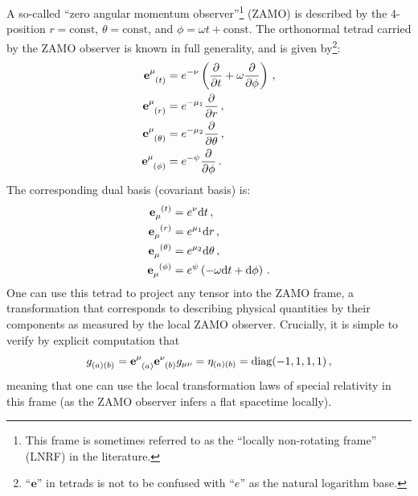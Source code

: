 \documentclass[
    reprint,
    prd,
    nofootinbib,
    amsmath,amssymb,
    aps,
    floatfix,
]{revtex4-2}
\begin{document}
A so-called ``zero angular momentum observer''\footnote{This frame is sometimes referred to as the ``locally non-rotating frame'' (LNRF) in the literature.} (ZAMO) is described by the 4-position $r = \text{const}$, $\theta = \text{const}$, and $\phi = \omega t + \text{const}$. The orthonormal tetrad carried by the ZAMO observer is known in full generality, and is given by\footnote{ ``$\mathbf{e}$'' in tetrads is not to be confused with ``$e$'' as the natural logarithm base.}:
\begin{equation}
    \begin{split}
        \tensor{\mathbf{e}}{^\mu_{(t)}} &= e^{-\nu} \left( \frac{\partial }{\partial t} + \omega \frac{\partial }{\partial \phi} \right) \, , \\
        \tensor{\mathbf{e}}{^\mu_{(r)}} &= e^{-\mu_{1}} \frac{\partial }{\partial r} \, , \\
        \tensor{\mathbf{e}}{^\mu_{(\theta)}} &= e^{-\mu_{2}} \frac{\partial }{\partial \theta} \, , \\
        \tensor{\mathbf{e}}{^\mu_{(\phi)}} &= e^{-\psi} \frac{\partial }{\partial \phi} \, .
    \end{split}
\end{equation}
The corresponding dual basis (covariant basis) is:
\begin{equation}
    \begin{split}
        \tensor{\mathbf{e}}{_{\mu}^{(t)}} &= e^{\nu} \mathrm{d}t \, , \\
        \tensor{\mathbf{e}}{_{\mu}^{(r)}} &= e^{\mu_{1}} \mathrm{d}r \, , \\
        \tensor{\mathbf{e}}{_{\mu}^{(\theta)}} &= e^{\mu_{2}} \mathrm{d}\theta \, , \\
        \tensor{\mathbf{e}}{_{\mu}^{(\phi)}} &= e^{\psi} \left( -\omega\mathrm{d}t + \mathrm{d}\phi \right) \, .
    \end{split}
\end{equation}
One can use this tetrad to project any tensor into the ZAMO frame, a transformation that corresponds to describing physical quantities by their components as measured by the local ZAMO observer. Crucially, it is simple to verify by explicit computation that 
\begin{equation}
    \tensor{g}{_{(a)(b)}} = \tensor{\mathbf{e}}{^\mu_{(a)}} \tensor{\mathbf{e}}{^\nu_{(b)}} g_{\mu\nu} = \eta_{(a)(b)} = \mathrm{diag}(-1,1,1,1) \, ,
\end{equation}
meaning that one can use the local transformation laws of special relativity in this frame (as the ZAMO observer infers a flat spacetime locally). 
\end{document}

